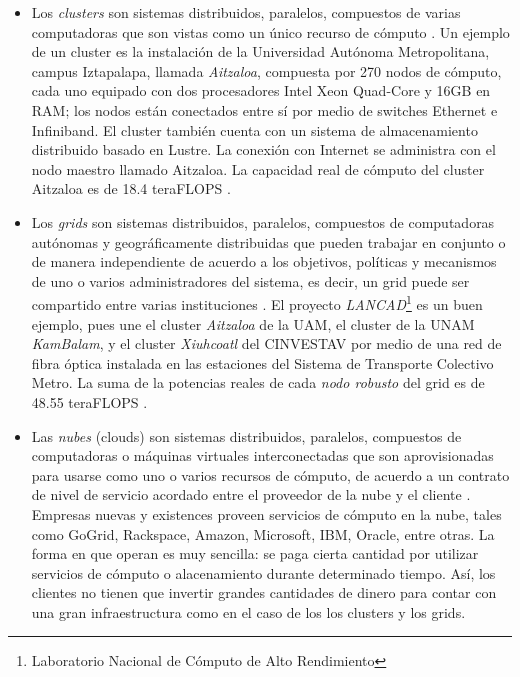 \documentclass[letterpaper]{report}
\begin{document}
\begin{itemize}
\item Los \emph{clusters} son sistemas distribuidos, paralelos, compuestos de varias computadoras que son vistas como un único recurso de cómputo \cite{buyya2009cloud}. Un ejemplo de un cluster es la instalación de la Universidad Autónoma Metropolitana, campus Iztapalapa, llamada \emph{Aitzaloa}, compuesta por 270 nodos de cómputo, cada uno equipado con dos procesadores Intel Xeon Quad-Core y 16GB en RAM; los nodos están conectados entre sí por medio de switches Ethernet e Infiniband. El cluster también cuenta con un sistema de almacenamiento distribuido basado en Lustre. La conexión con Internet se administra con el nodo maestro llamado Aitzaloa. La capacidad real de cómputo del cluster Aitzaloa es de 18.4 teraFLOPS \cite{uamz2013tizaloa}.

\item Los \emph{grids} son sistemas distribuidos, paralelos, compuestos de computadoras autónomas y geográficamente distribuidas que pueden trabajar en conjunto o de manera independiente de acuerdo a los objetivos, políticas y mecanismos de uno o varios administradores del sistema, es decir, un grid puede ser compartido entre varias instituciones \cite{buyya2009cloud}. El proyecto \emph{LANCAD}\footnote{Laboratorio Nacional de Cómputo de Alto Rendimiento} es un buen ejemplo, pues une el cluster \emph{Aitzaloa} de la UAM, el cluster de la UNAM \emph{KamBalam}, y el cluster \emph{Xiuhcoatl} del CINVESTAV por medio de una red de fibra óptica instalada en las estaciones del Sistema de Transporte Colectivo Metro. La suma de la potencias reales de cada \emph{nodo robusto} del grid es de 48.55 teraFLOPS \cite{lancad2013xiuhcoatl}.

\item Las \emph{nubes} (clouds) son sistemas distribuidos, paralelos, compuestos de computadoras o máquinas virtuales interconectadas que son aprovisionadas para usarse como uno o varios recursos de cómputo, de acuerdo a un contrato de nivel de servicio acordado entre el proveedor de la nube y el cliente \cite{buyya2009cloud}. Empresas nuevas y existences proveen servicios de cómputo en la nube, tales como GoGrid, Rackspace, Amazon, Microsoft, IBM, Oracle, entre otras. La forma en que operan es muy sencilla: se paga cierta cantidad por utilizar servicios de cómputo o alacenamiento durante determinado tiempo. Así, los clientes no tienen que invertir grandes cantidades de dinero para contar con una gran infraestructura como en el caso de los los clusters y los grids.
\end{itemize}
\end{document}
